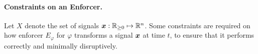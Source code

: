     \paragraph{Constraints on an Enforcer.} Let $X$ denote the set of signals \(\bm{x} : \mathbb{R}_{\ge 0} \mapsto \mathbb{R}^n\). Some constraints are required on how enforcer $E_{\varphi}$ for $\varphi$ transforms a signal $\bm{x}$ at time $t$, to ensure that it performs correctly and minimally disruptively. %
    
    
    

